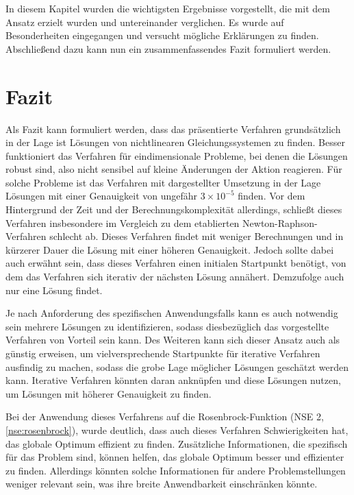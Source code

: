 \documentclass{article}
\theoremstyle{newline}
\begin{document}
\begin{onehalfspace}
In diesem Kapitel wurden die wichtigsten Ergebnisse vorgestellt, die mit dem Ansatz erzielt wurden und untereinander verglichen. Es wurde auf Besonderheiten eingegangen und versucht mögliche Erklärungen zu finden. Abschließend dazu kann nun ein zusammenfassendes Fazit formuliert werden.


\section{Fazit}

Als Fazit kann formuliert werden, dass das präsentierte Verfahren grundsätzlich in der Lage ist Lösungen von nichtlinearen Gleichungssystemen zu finden. Besser funktioniert das Verfahren für eindimensionale Probleme, bei denen die Lösungen robust sind, also nicht sensibel auf kleine Änderungen der Aktion reagieren. Für solche Probleme ist das Verfahren mit dargestellter Umsetzung in der Lage Lösungen mit einer Genauigkeit von ungefähr $3 \times 10^{-5}$ finden. Vor dem Hintergrund der Zeit und der Berechnungskomplexität allerdings, schließt dieses Verfahren insbesondere im Vergleich zu dem etablierten Newton-Raphson-Verfahren schlecht ab. Dieses Verfahren findet mit weniger Berechnungen und in kürzerer Dauer die Lösung mit einer höheren Genauigkeit. Jedoch sollte dabei auch erwähnt sein, dass dieses Verfahren einen initialen Startpunkt benötigt, von dem das Verfahren sich iterativ der nächsten Lösung annähert. Demzufolge auch nur eine Lösung findet.
\smallskip

Je nach Anforderung des spezifischen Anwendungsfalls kann es auch notwendig sein mehrere Lösungen zu identifizieren, sodass diesbezüglich das vorgestellte Verfahren von Vorteil sein kann. Des Weiteren kann sich dieser Ansatz auch als günstig erweisen, um vielversprechende Startpunkte für iterative Verfahren ausfindig zu machen, sodass die grobe Lage möglicher Lösungen geschätzt werden kann. Iterative Verfahren könnten daran anknüpfen und diese Lösungen nutzen, um Lösungen mit höherer Genauigkeit zu finden. 
\medskip

Bei der Anwendung dieses Verfahrens auf die Rosenbrock-Funktion (NSE 2, \ref{nse:rosenbrock}), wurde deutlich, dass auch dieses Verfahren Schwierigkeiten hat, das globale Optimum effizient zu finden. Zusätzliche Informationen, die spezifisch für das Problem sind, können helfen, das globale Optimum besser und effizienter zu finden. Allerdings könnten solche Informationen für andere Problemstellungen weniger relevant sein, was ihre breite Anwendbarkeit einschränken könnte.
\medskip


\end{onehalfspace}
\end{document}
